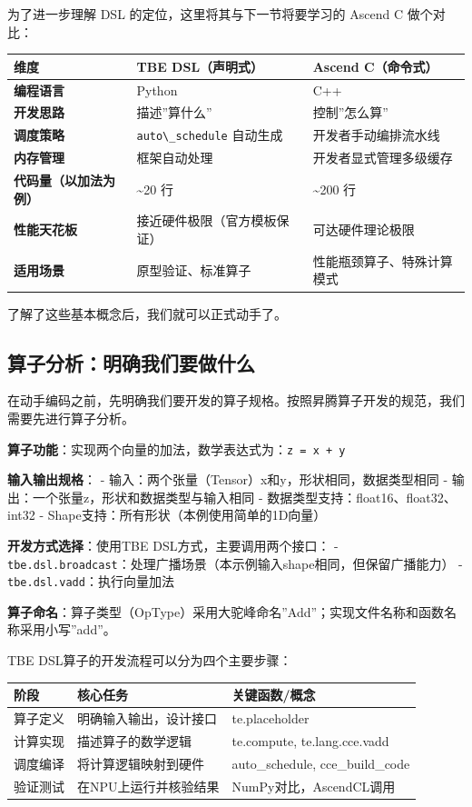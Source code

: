 为了进一步理解 DSL 的定位，这里将其与下一节将要学习的 Ascend C
做个对比：

\begin{longtable}[]{@{}lll@{}}
\toprule\noalign{}
维度 & TBE DSL（声明式） & Ascend C（命令式） \\
\midrule\noalign{}
\endhead
\bottomrule\noalign{}
\endlastfoot
\textbf{编程语言} & Python & C++ \\
\textbf{开发思路} & 描述''算什么'' & 控制''怎么算'' \\
\textbf{调度策略} & \passthrough{\lstinline!auto\_schedule!} 自动生成 &
开发者手动编排流水线 \\
\textbf{内存管理} & 框架自动处理 & 开发者显式管理多级缓存 \\
\textbf{代码量（以加法为例）} & \textasciitilde20 行 &
\textasciitilde200 行 \\
\textbf{性能天花板} & 接近硬件极限（官方模板保证） & 可达硬件理论极限 \\
\textbf{适用场景} & 原型验证、标准算子 & 性能瓶颈算子、特殊计算模式 \\
\end{longtable}

了解了这些基本概念后，我们就可以正式动手了。

\subsection{算子分析：明确我们要做什么}\label{src-book-chapter7-h18}

在动手编码之前，先明确我们要开发的算子规格。按照昇腾算子开发的规范，我们需要先进行算子分析。

\textbf{算子功能}：实现两个向量的加法，数学表达式为：\passthrough{\lstinline!z = x + y!}

\textbf{输入输出规格}： -
输入：两个张量（Tensor）x和y，形状相同，数据类型相同 -
输出：一个张量z，形状和数据类型与输入相同 -
数据类型支持：float16、float32、int32 -
Shape支持：所有形状（本例使用简单的1D向量）

\textbf{开发方式选择}：使用TBE DSL方式，主要调用两个接口： -
\passthrough{\lstinline!tbe.dsl.broadcast!}：处理广播场景（本示例输入shape相同，但保留广播能力）
- \passthrough{\lstinline!tbe.dsl.vadd!}：执行向量加法

\textbf{算子命名}：算子类型（OpType）采用大驼峰命名''Add''；实现文件名称和函数名称采用小写''add''。

TBE DSL算子的开发流程可以分为四个主要步骤：

\begin{longtable}[]{@{}lll@{}}
\toprule\noalign{}
阶段 & 核心任务 & 关键函数/概念 \\
\midrule\noalign{}
\endhead
\bottomrule\noalign{}
\endlastfoot
算子定义 & 明确输入输出，设计接口 & te.placeholder \\
计算实现 & 描述算子的数学逻辑 & te.compute, te.lang.cce.vadd \\
调度编译 & 将计算逻辑映射到硬件 & auto\_schedule, cce\_build\_code \\
验证测试 & 在NPU上运行并核验结果 & NumPy对比，AscendCL调用 \\
\end{longtable}

